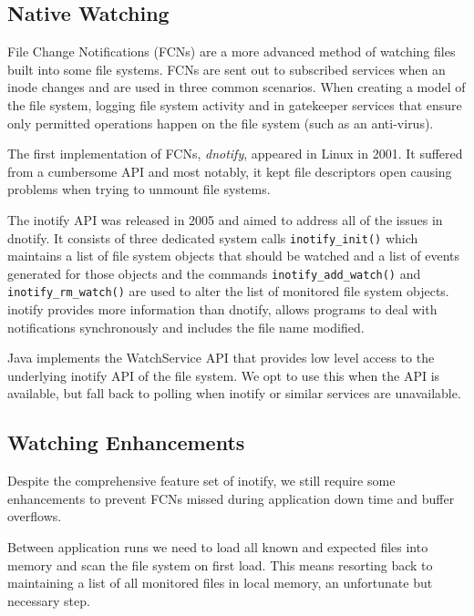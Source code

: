 \documentclass[11pt, a4paper, twoside]{report}
\def\code#1{\texttt{#1}}
\begin{document}
\subsection{Native Watching}

File Change Notifications (FCNs) are a more advanced method of watching files built into some file systems. FCNs are sent out to subscribed services when an inode changes and are used in three common scenarios. When creating a model of the file system, logging file system activity and in gatekeeper services that ensure only permitted operations happen on the file system (such as an anti-virus). \citep{kerrisk2014fcn}

The first implementation of FCNs, \emph{dnotify}, appeared in Linux in 2001. It suffered from a cumbersome API and most notably, it kept file descriptors open causing problems when trying to unmount file systems. \citep{kerrisk2014fcn}

The inotify API was released in 2005 and aimed to address all of the issues in dnotify. It consists of three dedicated system calls \code{inotify\_init()} which maintains a list of file system objects that should be watched and a list of events generated for those objects and the commands \code{inotify\_add\_watch()} and \code{inotify\_rm\_watch()} are used to alter the list of monitored file system objects. inotify provides more information than dnotify, allows programs to deal with notifications synchronously and includes the file name modified. \citep{kerrisk2014fcn}

Java implements the WatchService API that provides low level access to the underlying inotify API of the file system. \citep{oracle2017dir} We opt to use this when the API is available, but fall back to polling when inotify or similar services are unavailable.

\subsection{Watching Enhancements}

Despite the comprehensive feature set of inotify, we still require some enhancements to prevent FCNs missed during application down time and buffer overflows. 

Between application runs we need to load all known and expected files into memory and scan the file system on first load. This means resorting back to maintaining a list of all monitored files in local memory, an unfortunate but necessary step.
\end{document}
